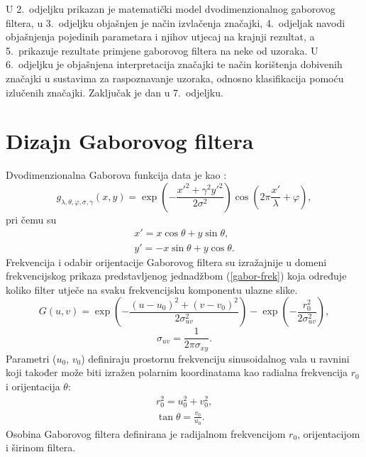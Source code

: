 \documentclass{article}
\begin{document}
U 2.~odjeljku prikazan je matematički model dvodimenzionalnog gaborovog filtera,
u 3.~odjeljku objašnjen je način izvlačenja značajki, 4.~odjeljak navodi objašnjenja
pojedinih parametara i njihov utjecaj na krajnji rezultat, a 5.~prikazuje
rezultate primjene gaborovog filtera na neke od uzoraka. U 6.~odjeljku je
objašnjena interpretacija značajki te način korištenja dobivenih značajki u
sustavima za raspoznavanje uzoraka, odnosno klasifikacija pomoću izlučenih
značajki. Zaključak je dan u 7.~odjeljku.

\section{Dizajn Gaborovog filtera}
Dvodimenzionalna Gaborova funkcija data je kao \citep{petkovgabor}:
\begin{equation}
g_{\lambda,\theta,\varphi,\sigma,\gamma}(x,y) = \exp\left ( -
\frac{x'^2+\gamma^2 y'^2}{2\sigma^2}\right ) \cos \left ( 2\pi \frac{x'}{\lambda} + \varphi \right ),
\label{2d-gabor}
\end{equation}
pri čemu su
\begin{eqnarray*}
x' = x \cos \theta + y \sin \theta, \\
y' = -x \sin \theta + y \cos \theta.
\end{eqnarray*}
Frekvencija i odabir orijentacije Gaborovog filtera su izražajnije u domeni
frekvencijskog prikaza predstavljenog jednadžbom (\ref{gabor-frek}) koja
određuje koliko filter utječe na svaku frekvencijsku komponentu ulazne slike.
\begin{equation}
G(u,v) = \exp \left ( - \frac{(u-u_0)^2 + (v-v_0)^2}{2\sigma^2_{uv}}\right ) -
\exp \left ( - \frac{r_0^2}{2\sigma^2_{uv}} \right),
\label{gabor-frek}
\end{equation}
\begin{equation}
\sigma_{uv} = \frac{1}{2\pi \sigma_{xy}}.
\end{equation}
Parametri ($u_0$, $v_0$) definiraju prostornu frekvenciju sinusoidalnog vala u
ravnini koji također može biti izražen polarnim koordinatama kao radialna frekvencija $r_0$ i
orijentacija $\theta$:
\begin{eqnarray}
r_0^2 = u_0^2 + v_0^2, \\
\tan \theta = \frac{v_0}{u_0}.
\end{eqnarray}
Osobina Gaborovog filtera definirana je radijalnom frekvencijom $r_0$,
orijentacijom i širinom filtera.
\end{document}
